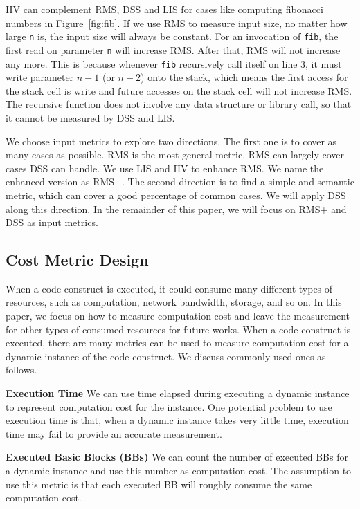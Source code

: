 IIV can complement RMS, DSS and LIS for cases like 
computing fibonacci numbers in Figure~\ref{fig:fib}. 
If we use RMS to measure input size,
no matter how large \texttt{n} is, the input size will always be constant. 
For an invocation of \texttt{fib},
the first read on parameter \texttt{n} will increase RMS.
After that, RMS will not increase any more.
This is because whenever \texttt{fib} recursively call itself on line 3,
it must write parameter $n-1$ (or $n-2$) onto the stack, 
which means the first access for the stack cell is write 
and future accesses on the stack cell will not increase RMS. 
The recursive function does not
involve any data structure or library call, 
so that it cannot be measured by DSS and LIS. 
 

We choose input metrics to explore two directions. 
The first one is to cover as many cases as possible. 
RMS is the most general metric.
RMS can largely cover cases DSS can handle.
We use LIS and IIV to enhance RMS.
We name the enhanced version as RMS+.
The second direction is to find a simple and semantic metric, 
which can cover  a good percentage of common cases. 
We will apply DSS along this direction. 
In the remainder of this paper, 
we will focus on RMS+ and DSS as input metrics. 

\subsection{Cost Metric Design}
When a code construct is executed, 
it could consume many different types of resources, 
such as computation, network bandwidth, storage, and so on.
In this paper, we focus on how to measure computation cost and 
leave the measurement for other types of consumed resources for future works. 
When a code construct is executed, 
there are many metrics can be used to measure computation 
cost for a dynamic instance of the code construct. 
We discuss commonly used ones as follows.

\noindent\textbf{Execution Time}
We can use time elapsed during executing a dynamic instance to represent computation cost 
for the instance.
One potential problem to use execution time is that, 
when a dynamic instance takes very little time, 
execution time may fail to provide an accurate measurement.  

\noindent\textbf{Executed Basic Blocks (BBs)}
We can count the number of executed BBs for a dynamic instance
and use this number as computation cost. 
The assumption to use this metric is that 
each executed BB will roughly consume the same computation cost. 

